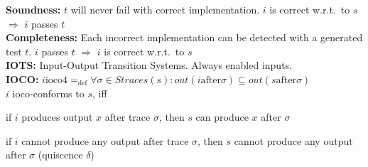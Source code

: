 \textbf{Soundness:} $t$ will never fail with correct implementation. $i$ is correct w.r.t.\ to $s$ $\Rightarrow$ $i$ passes $t$\\
\textbf{Completeness:} Each incorrect implementation can be detected with a generated test $t$. $i$ passes $t$ $\Rightarrow$ $i$ is correct w.r.t.\ to $s$\\
\textbf{IOTS:} Input-Output Transition Systems. Always enabled inputs.\\
\textbf{IOCO:} $i \text{ioco} 4 =_{\text{def}} \forall \sigma \in Straces(s): out(i \text{after} \sigma) \subseteq out(s \text{after} \sigma)$\\
$i$ ioco-conforms to $s$, iff
\begin{itemize*}
    \item if $i$ produces output $x$ after trace $\sigma$, then $s$ can produce $x$ after $\sigma$
    \item if $i$ cannot produce any output after trace $\sigma$, then $s$ cannot produce any output after $\sigma$ (quiscence $\delta$)
\end{itemize*}

